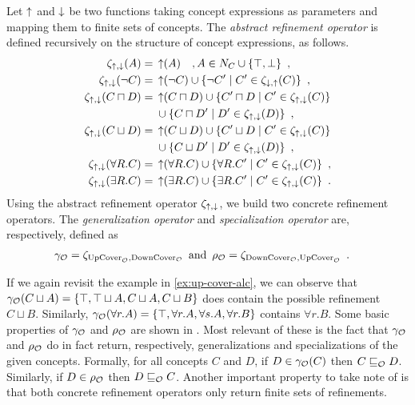 \begin{definition}
  Let $\operatorname{\uparrow}$ and $\operatorname{\downarrow}$ be two functions taking concept expressions as parameters and mapping them to finite sets of concepts.
  The \emph{abstract refinement operator} is defined recursively on the structure of concept expressions, as follows.
  \begin{align*}
    \zeta_{\operatorname{\uparrow},\operatorname{\downarrow}}(A) ={} & \operatorname{\uparrow}(A) \quad, A \in N_C \cup \{\top, \bot\} \enspace, \\
    \zeta_{\operatorname{\uparrow},\operatorname{\downarrow}}(\lnot C) ={} & \operatorname{\uparrow}(\lnot C) \cup \{ \lnot C' \mid C' \in \zeta_{\operatorname{\downarrow},\operatorname{\uparrow}}(C) \} \enspace, \\
    \zeta_{\operatorname{\uparrow},\operatorname{\downarrow}}(C \sqcap D) ={} & \operatorname{\uparrow}(C \sqcap D) \cup \{ C' \sqcap D \mid C' \in \zeta_{\operatorname{\uparrow},\operatorname{\downarrow}}(C) \} \\
    & \cup \{ C \sqcap D' \mid D' \in \zeta_{\operatorname{\uparrow},\operatorname{\downarrow}}(D) \} \enspace, \\
    \zeta_{\operatorname{\uparrow},\operatorname{\downarrow}}(C \sqcup D) ={} & \operatorname{\uparrow}(C \sqcup D) \cup \{ C' \sqcup D \mid C' \in \zeta_{\operatorname{\uparrow},\operatorname{\downarrow}}(C) \} \\
    & \cup \{ C \sqcup D' \mid D' \in \zeta_{\operatorname{\uparrow},\operatorname{\downarrow}}(D) \} \enspace, \\
    \zeta_{\operatorname{\uparrow},\operatorname{\downarrow}}(\forall R.C) ={} & \operatorname{\uparrow}(\forall R.C)
    \cup \{ \forall R.C' \mid C' \in \zeta_{\operatorname{\uparrow},\operatorname{\downarrow}}(C) \} \enspace, \\
    \zeta_{\operatorname{\uparrow},\operatorname{\downarrow}}(\exists R.C) ={} & \operatorname{\uparrow}(\exists R.C)
    \cup \{ \exists R.C' \mid C' \in \zeta_{\operatorname{\uparrow},\operatorname{\downarrow}}(C) \} \enspace.
  \end{align*}
  Using the abstract refinement operator $\zeta_{\operatorname{\uparrow},\operatorname{\downarrow}}$, we build two concrete refinement operators. The \emph{generalization operator} and \emph{specialization operator} are, respectively, defined as
  \begin{align*}
    \gamma_\mathcal{O} &= \zeta_{{\operatorname{UpCover}}_\mathcal{O},{\operatorname{DownCover}}_\mathcal{O}} \enspace \text{and} \enspace
    \rho_\mathcal{O} = \zeta_{{\operatorname{DownCover}}_\mathcal{O},{\operatorname{UpCover}}_\mathcal{O}} \enspace.
  \end{align*}
\end{definition}

If we again revisit the example in \cref{ex:up-cover-alc}, we can observe that $\gamma_\mathcal{O}(C \sqcup A) = \{ \top, \top \sqcup A, C \sqcup A, C \sqcup B \}$ does contain the possible refinement $C \sqcup B$. Similarly, $\gamma_\mathcal{O}(\forall r.A) = \{ \top, \forall r.A, \forall s.A, \forall r.B \}$ contains $\forall r.B$. Some basic properties of $\gamma_\mathcal{O}$ and $\rho_\mathcal{O}$ are shown in \cite{troquard2018repairing}. Most relevant of these is the fact that $\gamma_\mathcal{O}$ and $\rho_\mathcal{O}$ do in fact return, respectively, generalizations and specializations of the given concepts. Formally, for all concepts $C$ and $D$, if $D \in \gamma_\mathcal{O}(C)$ then $C \sqsubseteq_\mathcal{O} D$. Similarly, if $D \in \rho_\mathcal{O}$ then $D \sqsubseteq_\mathcal{O} C$. Another important property to take note of is that both concrete refinement operators only return finite sets of refinements.

